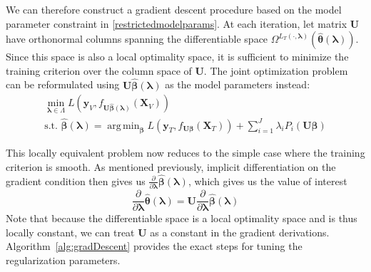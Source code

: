 \documentclass{statsoc}
\DeclareMathOperator*{\argmin}{arg\,min}
\begin{document}
We can therefore construct a gradient descent procedure based on the model parameter constraint in \eqref{restrictedmodelparams}. At each iteration, let matrix $\boldsymbol U$ have orthonormal columns spanning the differentiable space $\Omega^{L_T(\cdot, \boldsymbol{\lambda})}(\hat {\boldsymbol \theta}(\boldsymbol{\lambda}))$. Since this space is also a local optimality space, it is sufficient to minimize the training criterion over the column space of $\boldsymbol U$. The joint optimization problem can be reformulated using $\boldsymbol U \hat {\boldsymbol \beta}(\boldsymbol{\lambda})$ as the model parameters instead:
\begin{equation}
\begin{array}{c}
\min_{\boldsymbol \lambda \in \Lambda} L(\boldsymbol y_V, f_{\boldsymbol U \hat{\boldsymbol \beta} (\boldsymbol \lambda) }(\boldsymbol X_V)) \\
\text{s.t. } \hat{\boldsymbol \beta} (\boldsymbol \lambda) =
\argmin_{\boldsymbol \beta}
L(\boldsymbol y_T, f_{\boldsymbol U \boldsymbol \beta}(\boldsymbol X_T))
+ \sum\limits_{i=1}^J \lambda_i P_i(\boldsymbol U \boldsymbol \beta)
\end{array}
\end{equation}

This locally equivalent problem now reduces to the simple case where the training criterion is smooth. As mentioned previously, implicit differentiation on the gradient condition then gives us $\frac{\partial}{\partial \boldsymbol \lambda}\hat{\boldsymbol \beta}(\boldsymbol \lambda)$, which gives us the value of interest
\begin{equation}
\frac{\partial}{\partial \boldsymbol \lambda}
\hat{\boldsymbol \theta}(\boldsymbol \lambda) =
\boldsymbol U
\frac{\partial}{\partial \boldsymbol \lambda}\hat{\boldsymbol \beta}(\boldsymbol \lambda)
\end{equation}
Note that because the differentiable space is a local optimality space and is thus locally constant, we can treat $\boldsymbol U$ as a constant in the gradient derivations. Algorithm~\ref{alg:gradDescent} provides the exact steps for tuning the regularization parameters.
\end{document}
